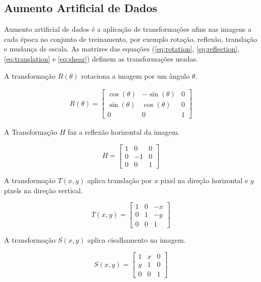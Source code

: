 \documentclass[a4,12pt]{horizon-theme}
\begin{document}
\subsection{Aumento Artificial de Dados}
\label{sec:dataaug}
Aumento artificial de dados \citep{Larry1996} é a aplicação de transformações afins nas imagens a cada época no conjunto de treinamento, por exemplo rotação, reflexão, translação e mudança de escala. As matrizes das equações (\ref{eq:rotation}, \ref{eq:reflection}, \ref{eq:translation} e \ref{eq:shear}) definem as transformações usadas.

A transformação $R(\theta)$ rotaciona a imagem por um ângulo $\theta$.

\begin{equation}\label{eq:rotation}
  \begin{gathered}
    R(\theta) =
    \begin{bmatrix}
      \cos(\theta) & -\sin(\theta) & 0 \\
      \sin(\theta) & \cos(\theta)  & 0 \\
      0            & 0             & 1
    \end{bmatrix}
  \end{gathered}
\end{equation}

A Transformação $H$ faz a reflexão horizontal da imagem.

\begin{equation}\label{eq:reflection}
  H =
  \begin{bmatrix}
    1 & 0  & 0 \\
    0 & -1 & 0 \\
    0 & 0  & 1
  \end{bmatrix}
\end{equation}

A transformação $T(x, y)$ aplica translação por $x$ pixel na direção horizontal e $y$ pixels na direção vertical.

\begin{equation}\label{eq:translation}
  T(x, y) =
  \begin{bmatrix}
    1 & 0 & -x \\
    0 & 1 & -y \\
    0 & 0 & 1
  \end{bmatrix}
\end{equation}

A transformação $S(x, y)$ aplica cisalhamento na imagem.

\begin{equation}\label{eq:shear}
  S(x, y) =
  \begin{bmatrix}
    1 & x & 0 \\
    y & 1 & 0 \\
    0 & 0 & 1
  \end{bmatrix}
\end{equation}
\end{document}
